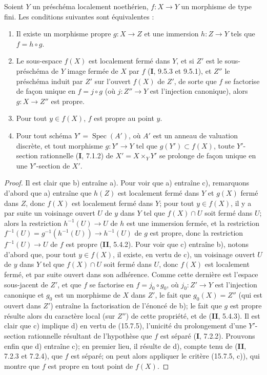 \begin{corollary}[15.7.6]
\label{IV.15.7.6-fr}
Soient $Y$ un préschéma localement noethérien, $f:X\to Y$ un morphisme de type fini. Les conditions suivantes sont équivalentes :
\begin{enumerate}
  \item[\rm a)] Il existe un morphisme propre $g:X\to Z$ et une immersion $h:Z\to Y$ tels que $f=h\circ g$.
  \item[\rm b)] Le sous-espace $f(X)$ est localement fermé dans $Y$, et si $Z'$ est le sous-préschéma de $Y$ image fermée de $X$ par $f$ (\textbf{I}, 9.5.3 et 9.5.1), et $Z''$ le préschéma induit par $Z'$ sur l'ouvert $f(X)$ de $Z'$, de sorte que $f$ se factorise de façon unique en $f=j\circ g$ (où $j:Z''\to Y$ est l'injection canonique), alors $g:X\to Z''$ est propre.
  \item[\rm c)] Pour tout $y\in f(X)$, $f$ est propre au point $y$.
  \item[\rm d)] Pour tout schéma $Y'=\operatorname{Spec}(A')$, où $A'$ est un anneau de valuation discrète, et tout morphisme $g:Y'\to Y$ tel que $g(Y')\subset f(X)$, toute $Y'$-section rationnelle (\textbf{I}, 7.1.2) de $X'=X\times_Y Y'$ se prolonge de façon unique en une $Y'$-section de $X'$.
\end{enumerate}
\end{corollary}

\begin{proof}
Il est clair que b) entraîne a). Pour voir que a) entraîne c), remarquons d'abord que a) entraîne que $h(Z)$ est localement fermé dans $Y$ et $g(X)$ fermé dans $Z$, donc $f(X)$ est localement fermé dans $Y$; pour tout $y\in f(X)$, il y a par suite un voisinage ouvert $U$
de $y$ dans $Y$ tel que $f(X)\cap U$ soit fermé dans $U$; alors la restriction $h^{-1}(U)\to U$ de $h$ est une immersion fermée, et la restriction $f^{-1}(U)=g^{-1}(h^{-1}(U))\to h^{-1}(U)$ de $g$ est propre, donc la restriction $f^{-1}(U)\to U$ de $f$ est propre (\textbf{II}, 5.4.2). Pour voir que c) entraîne b), notons d'abord que, pour tout $y\in f(X)$, il existe, en vertu de c), un voisinage ouvert $U$ de $y$ dans $Y$ tel que $f(X)\cap U$ soit fermé dans $U$, donc $f(X)$ est localement fermé, et par suite ouvert dans son adhérence. Comme cette dernière est l'espace sous-jacent de $Z'$, et que $f$ se factorise en $f=j_0\circ g_0$, où $j_0:Z'\to Y$ est l'injection canonique et $g_0$ est un morphisme de $X$ dans $Z'$, le fait que $g_0(X)=Z''$ (qui est ouvert dans $Z'$) entraîne la factorisation de l'énoncé de b); le fait que $g$ est propre résulte alors du caractère local (sur $Z''$) de cette propriété, et de (\textbf{II}, 5.4.3). Il est clair que c) implique d) en vertu de (15.7.5), l'unicité du prolongement d'une $Y'$-section rationnelle résultant de l'hypothèse que $f$ est séparé (\textbf{I}, 7.2.2). Prouvons enfin que d) entraîne c); en premier lieu, il résulte de d), compte tenu de (\textbf{II}, 7.2.3 et 7.2.4), que $f$ est séparé; on peut alors appliquer le critère (15.7.5, c)), qui montre que $f$ est propre en tout point de $f(X)$.
\end{proof}


